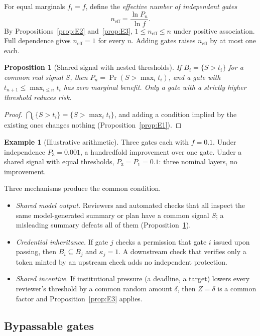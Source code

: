 \documentclass[11pt]{article}
\newtheorem{proposition}[theorem]{Proposition}
\theoremstyle{definition}
\newtheorem{example}[theorem]{Example}
\begin{document}
For equal marginals $f_i=f$, define the \emph{effective number of independent gates}
\[
n_{\mathrm{eff}}=\frac{\ln P_n}{\ln f}.
\]
By Propositions~\ref{prop:E2} and~\ref{prop:E3}, $1\le n_{\mathrm{eff}}\le n$ under positive association. Full dependence gives $n_{\mathrm{eff}}=1$ for every $n$. Adding gates raises $n_{\mathrm{eff}}$ by at most one each.

\begin{proposition}[Shared signal with nested thresholds]\label{prop:E4}
If $B_i=\{S>t_i\}$ for a common real signal $S$, then $P_n=\Pr(S>\max_it_i)$, and a gate with $t_{n+1}\le\max_{i\le n}t_i$ has zero marginal benefit. Only a gate with a strictly higher threshold reduces risk.
\end{proposition}
\begin{proof}
$\bigcap_i\{S>t_i\}=\{S>\max_it_i\}$, and adding a condition implied by the existing ones changes nothing (Proposition~\ref{prop:E1}).
\end{proof}

\begin{example}[Illustrative arithmetic]
Three gates each with $f=0.1$. Under independence $P_3=0.001$, a hundredfold improvement over one gate. Under a shared signal with equal thresholds, $P_3=P_1=0.1$: three nominal layers, no improvement.
\end{example}

Three mechanisms produce the common condition.

\begin{itemize}[leftmargin=1.6em,itemsep=0.1em]
\item \emph{Shared model output.} Reviewers and automated checks that all inspect the same model-generated summary or plan have a common signal $S$; a misleading summary defeats all of them (Proposition~\ref{prop:E4}).
\item \emph{Credential inheritance.} If gate $j$ checks a permission that gate $i$ issued upon passing, then $B_i\subseteq B_j$ and $\kappa_j=1$. A downstream check that verifies only a token minted by an upstream check adds no independent protection.
\item \emph{Shared incentive.} If institutional pressure (a deadline, a target) lowers every reviewer's threshold by a common random amount $\delta$, then $Z=\delta$ is a common factor and Proposition~\ref{prop:E3} applies.
\end{itemize}

\subsection{Bypassable gates}
\end{document}
